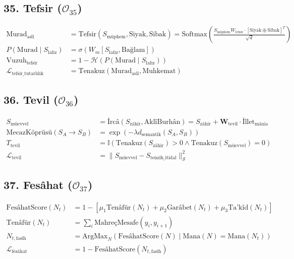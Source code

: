 \documentclass[11pt, a4paper]{article}
\begin{document}
\subsection{35. Tefsir ($\mathcal{O}_{35}$)}
\begin{align}
\text{Murad}_{\text{aslî}} &= \text{Tefsir}(S_{\text{müphem}}, \text{Siyak}, \text{Sibak}) = \text{Softmax}\left( \frac{S_{\text{müphem}} W_{\text{tefsir}} \cdot [\text{Siyak} \oplus \text{Sibak}]^T}{\sqrt{d}} \right) \\
P(\text{Murad} \mid S_{\text{lafız}}) &= \sigma( W_m [S_{\text{lafız}}, \text{Bağlam}] ) \\
\text{Vuzuh}_{\text{tefsir}} &= 1 - \mathcal{H}(P(\text{Murad} \mid S_{\text{lafız}})) \\
\mathcal{L}_{\text{tefsir\_tutarlılık}} &= \text{Tenakuz}(\text{Murad}_{\text{aslî}}, \text{Muhkemat})
\end{align}

\subsection{36. Tevil ($\mathcal{O}_{36}$)}
\begin{align}
S_{\text{müevvel}} &= \text{İrcâ}(S_{\text{zâhir}}, \text{AklîBurhân}) = S_{\text{zâhir}} + \mathbf{W}_{\text{tevil}} \cdot \text{İllet}_{\text{mânia}} \\
\text{MecazKöprüsü}(S_A \to S_B) &= \exp\left( -\lambda d_{\text{semantik}}(S_A, S_B) \right) \\
T_{\text{tevil}} &= \mathbb{I}\left( \text{Tenakuz}(S_{\text{zâhir}}) > 0 \land \text{Tenakuz}(S_{\text{müevvel}}) = 0 \right) \\
\mathcal{L}_{\text{tevil}} &= \| S_{\text{müevvel}} - S_{\text{tenzih\_itidal}} \|_{\mathcal{S}}^2
\end{align}

\subsection{37. Fesâhat ($\mathcal{O}_{37}$)}
\begin{align}
\text{FesâhatScore}(N_t) &= 1 - \left[ \mu_1 \text{Tenâfür}(N_t) + \mu_2 \text{Garâbet}(N_t) + \mu_3 \text{Ta'kîd}(N_t) \right] \\
\text{Tenâfür}(N_t) &= \sum_{i} \text{MahreçMesafe}(y_i, y_{i+1}) \\
N_{t, \text{fasîh}} &= \text{ArgMax}_{N} \left( \text{FesâhatScore}(N) \mid \text{Mana}(N) = \text{Mana}(N_t) \right) \\
\mathcal{L}_{\text{fesâhat}} &= 1 - \text{FesâhatScore}(N_{t, \text{fasîh}})
\end{align}
\end{document}
